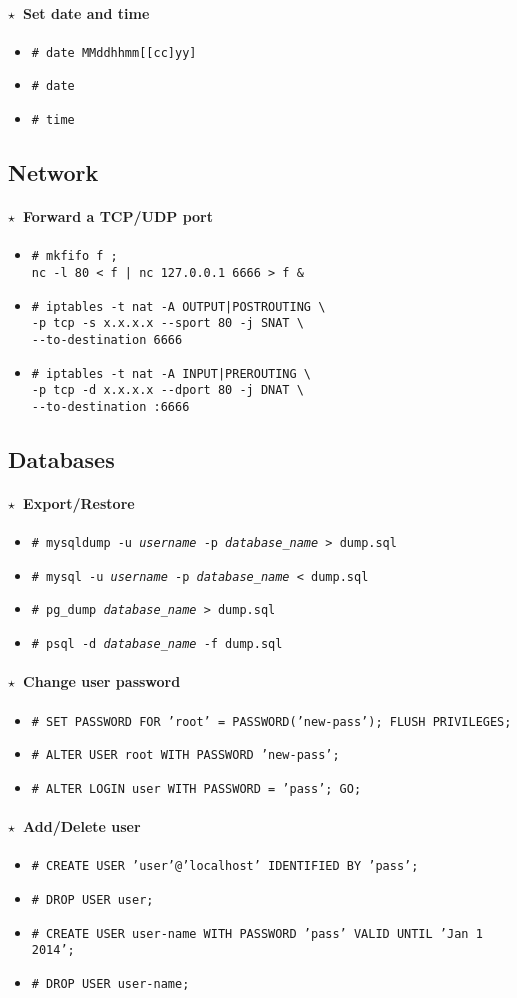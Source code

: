 \documentclass[10pt,landscape]{article}
\newcommand{\os}[1]{\texttt{\footnotesize{#1}}}
\newcommand{\unix}{\os{U}}
\newcommand{\linux}{\os{L}}
\newcommand{\windows}{\os{W}}
\newenvironment{action}[1]
  {\paragraph{$\star$~#1}\begin{itemize}[leftmargin=1cm]}
  {\end{itemize}}
\newcommand{\cmd}[2]{\item[#1] {\small\tt\# #2}}
\newcommand{\app}[1]{\footnotesize\sc{#1}}
\begin{document}
\begin{multicols*}{3}
\begin{action}{Set date and time}
\cmd{\unix}{date MMddhhmm[[cc]yy]}
\cmd{\windows}{date}
\cmd{\windows}{time}
\end{action}

\subsection*{Network}

\begin{action}{Forward a TCP/UDP port}
\cmd{\unix}{mkfifo f ;\\
nc -l 80 < f | nc 127.0.0.1 6666 > f \&}
\cmd{\linux}{iptables -t nat -A OUTPUT|POSTROUTING \textbackslash\\
  -p tcp -s x.x.x.x -{}-sport 80 -j SNAT \textbackslash\\
  -{}-to-destination 6666}
\cmd{\linux}{iptables -t nat -A INPUT|PREROUTING \textbackslash\\
  -p tcp -d x.x.x.x -{}-dport 80 -j DNAT \textbackslash\\
  -{}-to-destination :6666}
\end{action}

\subsection*{Databases}

\newcommand{\mysql}{\app{mysql}}
\newcommand{\postgres}{\app{psql}}
\newcommand{\mssql}{\app{mssql}}

\begin{action}{Export/Restore}
\cmd{\unix}{mysqldump -u \emph{username} -p \emph{database\_name} > dump.sql}
\cmd{\unix}{mysql -u \emph{username} -p \emph{database\_name} < dump.sql}
\cmd{\unix}{pg\_dump \emph{database\_name} > dump.sql}
\cmd{\unix}{psql -d \emph{database\_name} -f dump.sql}
\end{action}

\begin{action}{Change user password}
\cmd{\mysql}{SET PASSWORD FOR 'root' = PASSWORD('new-pass'); FLUSH PRIVILEGES;}
\cmd{\postgres}{ALTER USER root WITH PASSWORD 'new-pass';}
\cmd{\mssql}{ALTER LOGIN user WITH PASSWORD = 'pass'; GO;}
\end{action}

\begin{action}{Add/Delete user}
\cmd{\mysql}{CREATE USER 'user'@'localhost' IDENTIFIED BY 'pass';}
\cmd{\mysql}{DROP USER user;}
\cmd{\postgres}{CREATE USER user-name WITH PASSWORD 'pass' VALID UNTIL 'Jan 1 2014';}
\cmd{\postgres}{DROP USER user-name;}
\end{action}


\end{multicols*}
\end{document}
